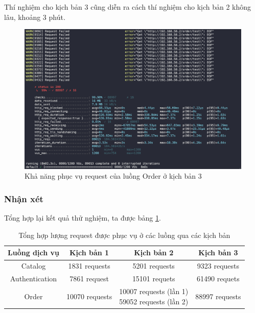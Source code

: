 \noindent Thí nghiệm cho kịch bản 3 cũng diễn ra cách thí nghiệm cho kịch bản 2 không lâu, khoảng 3 phút.

\begin{figure}[H]
  \begin{center}
      \includegraphics[scale = 0.65]{images/hanh/fullflow-test/order-hpa-8-db}
      \vspace*{1mm}
  \end{center}
  \caption{Khả năng phục vụ request của luồng Order ở kịch bản 3}
  \label{fig:fullflow-order-with-hpa-8-db}

\end{figure}

\subsubsection{Nhận xét}
\noindent Tổng hợp lại kết quả thử nghiệm, ta được bảng \ref{tab:stress-test-result}.
\begin{table}[H]
  \centering
  \begin{tabular}{|c|c|c|c|}
  \hline
  \textbf{Luồng dịch vụ} & \multicolumn{1}{c|}{\textbf{Kịch bản 1}} & \multicolumn{1}{c|}{\textbf{Kịch bản 2}} & \multicolumn{1}{c|}{\textbf{Kịch bản 3}}\\ \hline
  Catalog & 1831 requests & 5201 requests & 9323 requests \\ \hline
  Authentication & 7861 request & 15101 requets & 61490 requets \\ \hline
  Order & 10070 requests & \parbox[t]{3.4cm}{10007 requests (lần 1) \\ 59052 requests (lần 2)} & 88997 requests \\ \hline
  \end{tabular}%
  \caption{Tổng hợp lượng request được phục vụ ở các luồng qua các kịch bản}
  \label{tab:stress-test-result}
\end{table}

